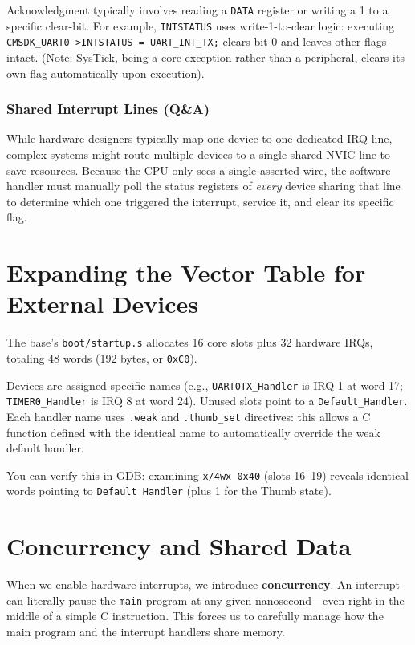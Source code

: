 Acknowledgment typically involves reading a \texttt{DATA} register or writing a 1 to a specific clear-bit. For example, \texttt{INTSTATUS} uses write-1-to-clear logic: executing \texttt{CMSDK\_UART0->INTSTATUS = UART\_INT\_TX;} clears bit 0 and leaves other flags intact. (Note: SysTick, being a core exception rather than a peripheral, clears its own flag automatically upon execution).

\subsubsection*{Shared Interrupt Lines (Q\&A)}
While hardware designers typically map one device to one dedicated IRQ line, complex systems might route multiple devices to a single shared NVIC line to save resources. Because the CPU only sees a single asserted wire, the software handler must manually poll the status registers of \textit{every} device sharing that line to determine which one triggered the interrupt, service it, and clear its specific flag.

\section{Expanding the Vector Table for External Devices}
The base's \texttt{boot/startup.s} allocates 16 core slots plus 32 hardware IRQs, totaling 48 words (192 bytes, or \texttt{0xC0}). 

Devices are assigned specific names (e.g., \texttt{UART0TX\_Handler} is IRQ 1 at word 17; \texttt{TIMER0\_Handler} is IRQ 8 at word 24). Unused slots point to a \texttt{Default\_Handler}. Each handler name uses \texttt{.weak} and \texttt{.thumb\_set} directives: this allows a C function defined with the identical name to automatically override the weak default handler.

You can verify this in GDB: examining \texttt{x/4wx 0x40} (slots 16--19) reveals identical words pointing to \texttt{Default\_Handler} (plus 1 for the Thumb state).

\section{Concurrency and Shared Data}

When we enable hardware interrupts, we introduce \textbf{concurrency}. An interrupt can literally pause the \texttt{main} program at any given nanosecond---even right in the middle of a simple C instruction. This forces us to carefully manage how the main program and the interrupt handlers share memory.

